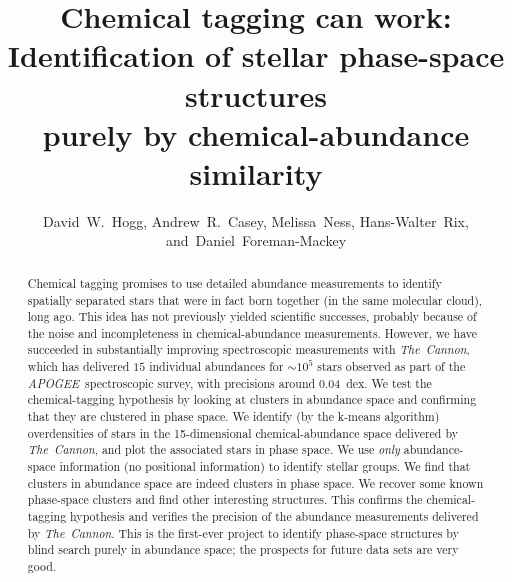 \documentclass[12pt, letterpaper, preprint]{aastex}
\newcommand{\acronym}[1]{{\small{#1}}}
\newcommand{\project}[1]{\textsl{#1}}
\newcommand{\apogee}{\project{\acronym{APOGEE}}}
\newcommand{\thecannon}{\project{The~Cannon}}
\begin{document}
\sloppy\sloppypar

\title{Chemical tagging can work: \\
       Identification of stellar phase-space structures \\
       purely by chemical-abundance similarity}
\author{David~W.~Hogg,
        Andrew~R.~Casey,
        Melissa~Ness,
        Hans-Walter~Rix,
    and~Daniel~Foreman-Mackey}

\begin{abstract}
Chemical tagging promises to use detailed abundance measurements to
identify spatially separated stars that were in fact born together
(in the same molecular cloud), long ago.
This idea has not previously yielded scientific successes, probably because of the
noise and incompleteness in chemical-abundance measurements.
However, we have succeeded in substantially improving spectroscopic
measurements with \thecannon, which has delivered $15$ individual
abundances for $\sim 10^5$ stars observed as part of the
\apogee\ spectroscopic survey, with precisions around 0.04~dex.
We test the chemical-tagging hypothesis by looking at clusters in abundance space
and confirming that they are clustered in phase space.
We identify (by the k-means algorithm) overdensities of stars
in the 15-dimensional chemical-abundance space delivered by \thecannon,
and plot the associated stars in phase space.
We use \emph{only} abundance-space information (no positional information) to identify stellar groups.
We find that clusters in abundance space are indeed clusters in phase space.
We recover some known phase-space clusters and find other interesting structures.
This confirms the chemical-tagging hypothesis and verifies the precision of the abundance measurements delivered by \thecannon.
This is the first-ever project to identify phase-space structures by blind search purely in abundance space;
the prospects for future data sets are very good.
\end{abstract}
\end{document}
